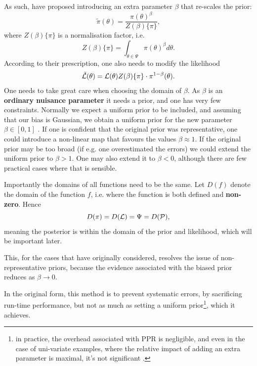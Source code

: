 \documentclass[usenatbib]{mnras}
\begin{document}
As such, \citeauthor{chen-ferroz-hobson} have proposed introducing an
extra parameter \(\beta\) that re-scales the prior:
\begin{equation}
  \tilde{\pi}(\theta) = \frac{\pi(\theta)^{\beta}}{Z(\beta)\{\pi\}},
\end{equation}
where \(Z(\beta)\{\pi\}\) is a normalisation factor, i.e. 
\begin{equation}
  Z(\beta)\{\pi\} = \int_{\theta \in \Psi} \pi(\theta)^{\beta}d\theta.
\end{equation}
According to their prescription, one also needs to modify the likelihood
\begin{equation}
  \tilde{\cal L}(\theta) = {\cal L}(\theta) Z(\beta)\{\pi\} \cdot \pi^{1-\beta}(\theta).
\end{equation}
One needs to take great care when choosing the domain of
\(\beta\). As \(\beta\) is an \textbf{ordinary nuisance parameter} it needs
a prior, and one has very few constraints. Normally we expect a
uniform prior to be included, and assuming that our bias is
Gaussian, we obtain a uniform prior for the new parameter \(\beta
   \in [0, 1]\) . If one is confident that the original prior was
representative, one could introduce a non-linear map that favours
the values \(\beta\approx1\). If the original prior may be too broad
(if e.g. one overestimated the errors) we could extend the uniform
prior to \(\beta>1\). One may also extend it to \(\beta<0\), although
there are few practical cases where that is sensible.




Importantly the domains of all functions need to be the same. Let
\(D(f)\) denote the domain of the function \(f\), i.e. where the
function is both defined and \textbf{non-zero}. Hence
\begin{equation}
  D(\pi) = D({\cal L}) = \Psi = D({\cal P}),
\end{equation} 
meaning the posterior is within the domain of the prior and
likelihood, which will be important later.\label{domain-discussion}

This, for the cases that \citeauthor{chen-ferroz-hobson} have
originally considered, resolves the issue of non-representative
priors, because the evidence associated with the biased prior
reduces as \(\beta\rightarrow0\).

In the original form, this method is to prevent systematic errors,
by sacrificing run-time performance, but not as much as setting a
uniform prior\footnote{in practice, the overhead associated with PPR
is negligible, and even in the case of uni-variate examples, where
the relative impact of adding an extra parameter is maximal, it's
not significant \cite[see numerical
examples]{chen-ferroz-hobson}.}, which it achieves. 
\end{document}
